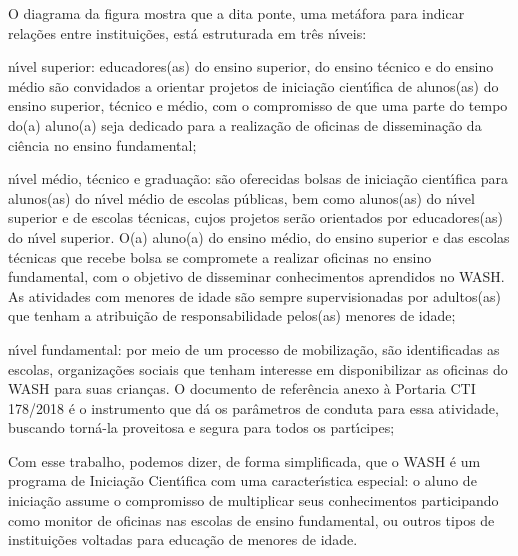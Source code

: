 \documentclass[
12pt,		%
openright,	%
twoside,  %
a4paper,			%
chapter=TITLE,		%
english,			%
french,				%
spanish,			%
brazil				%
]{USPSC-classe/USPSC}
\begin{document}
O diagrama da figura mostra que a dita \textquotedbl ponte\textquotedbl , uma met\'afora para indicar rela\c{c}\~oes entre institui\c{c}\~oes, est\'a estruturada em tr\^es n\'{\i}veis:









\begin{alineas}
\item n\'{\i}vel superior: educadores(as) do ensino superior, do ensino t\'ecnico e do ensino m\'edio s\~ao convidados a orientar projetos de inicia\c{c}\~ao cient\'{\i}fica de alunos(as) do ensino superior, t\'ecnico e m\'edio, com o compromisso de que uma parte do tempo do(a) aluno(a) seja dedicado para a realiza\c{c}\~ao de oficinas de dissemina\c{c}\~ao da ci\^encia no ensino fundamental;
\item n\'{\i}vel m\'edio, t\'ecnico e gradua\c{c}\~ao: s\~ao oferecidas bolsas de inicia\c{c}\~ao cient\'{\i}fica para alunos(as) do n\'{\i}vel m\'edio de escolas p\'ublicas, bem como alunos(as) do n\'{\i}vel superior e de escolas t\'ecnicas, cujos projetos ser\~ao orientados por educadores(as) do n\'{\i}vel superior. O(a) aluno(a) do ensino m\'edio, do ensino superior e das escolas t\'ecnicas que recebe bolsa se compromete a realizar oficinas no ensino fundamental, com o objetivo de disseminar conhecimentos aprendidos no WASH. As atividades com menores de idade s\~ao sempre supervisionadas por adultos(as) que tenham a  atribui\c{c}\~ao de responsabilidade pelos(as) menores de idade;
\item n\'{\i}vel fundamental: por meio de um processo de mobiliza\c{c}\~ao, s\~ao identificadas as escolas, organiza\c{c}\~oes sociais que tenham interesse em disponibilizar as oficinas do WASH para suas crian\c{c}as. O documento de refer\^encia anexo \`a Portaria CTI 178/2018 \'e o instrumento que d\'a os par\^ametros de conduta para essa atividade, buscando torn\'a-la proveitosa e segura para todos os part\'{\i}cipes;
\end{alineas}

Com esse trabalho, podemos dizer, de forma simplificada, que o WASH \'e um programa de Inicia\c{c}\~ao Cient\'{\i}fica com uma caracter\'{\i}stica especial: o aluno de inicia\c{c}\~ao assume o compromisso de multiplicar seus conhecimentos participando como monitor de oficinas nas escolas de ensino fundamental, ou outros tipos de institui\c{c}\~oes voltadas para educa\c{c}\~ao de menores de idade.
\end{document}
